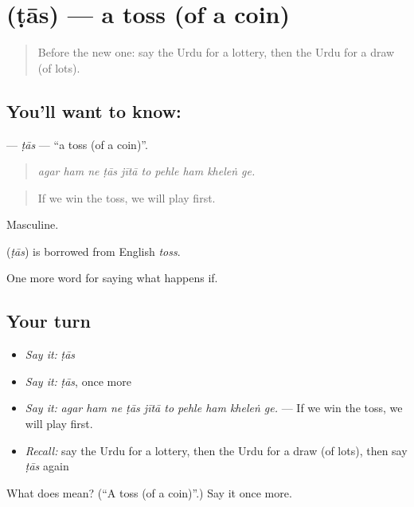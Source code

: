 \section[\texorpdfstring{\ur{ٹاس} (ṭās)}{ٹاس (ṭās)}]{ (ṭās) — a toss (of a coin)}

\label{lesson:UR-C532-tas}



\begin{quote}
Before the new one: say the Urdu for a lottery, then the Urdu for a draw (of lots).
\end{quote}

\subsection*{You'll want to know: }
\textbf{} — \emph{ṭās} — \textquotedblleft{}a toss (of a coin)\textquotedblright{}.

\begin{quote}
         
\end{quote}

\begin{quote}
\emph{agar ham ne ṭās jītā to pehle ham kheleṅ ge.}
\end{quote}

\begin{quote}
If we win the toss, we will play first.
\end{quote}

Masculine.

\begin{cousinweb}
\textbf{} (\emph{ṭās}) is borrowed from English \emph{toss}.
\end{cousinweb}

\begin{grammarlens}[title={What you've built}]
One more word for saying what happens if.
\end{grammarlens}

\subsection*{Your turn}
\begin{itemize}
\raggedright
  \item \emph{Say it:} \emph{ṭās}
  \item \emph{Say it:} \emph{ṭās}, once more
  \item \emph{Say it:} \emph{agar ham ne ṭās jītā to pehle ham kheleṅ ge.} — If we win the toss, we will play first.
  \item \emph{Recall:} say the Urdu for a lottery, then the Urdu for a draw (of lots), then say \emph{ṭās} again
\end{itemize}

\begin{tcolorbox}[breakable,colback=teal!4,colframe=teal!35!black,title={Before you move on}]
What does  mean? (\textquotedblleft{}A toss (of a coin)\textquotedblright{}.) Say it once more.
\end{tcolorbox}
